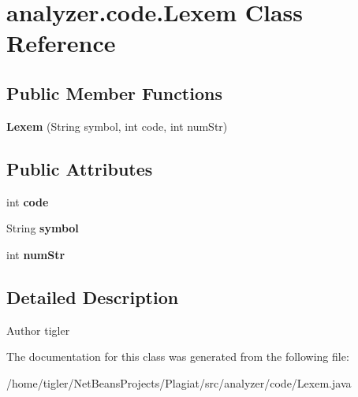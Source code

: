 \hypertarget{classanalyzer_1_1code_1_1Lexem}{}\section{analyzer.\+code.\+Lexem Class Reference}
\label{classanalyzer_1_1code_1_1Lexem}
\subsection*{Public Member Functions}
\begin{DoxyCompactItemize}
\item 
\mbox{\label{classanalyzer_1_1code_1_1Lexem_a4910a076f97361110c33e2a63abb490d}} 
{\bfseries Lexem} (String symbol, int code, int num\+Str)
\end{DoxyCompactItemize}
\subsection*{Public Attributes}
\begin{DoxyCompactItemize}
\item 
\mbox{\label{classanalyzer_1_1code_1_1Lexem_a930278746ac20d7c290c51c7d0720292}} 
int {\bfseries code}
\item 
\mbox{\label{classanalyzer_1_1code_1_1Lexem_a8c26f0d6518b66df1794c2e25c7f94fb}} 
String {\bfseries symbol}
\item 
\mbox{\label{classanalyzer_1_1code_1_1Lexem_ab040e60f7db2a596a852739fd744d290}} 
int {\bfseries num\+Str}
\end{DoxyCompactItemize}


\subsection{Detailed Description}
\begin{DoxyAuthor}{Author}
tigler 
\end{DoxyAuthor}


The documentation for this class was generated from the following file\+:\begin{DoxyCompactItemize}
\item 
/home/tigler/\+Net\+Beans\+Projects/\+Plagiat/src/analyzer/code/Lexem.\+java\end{DoxyCompactItemize}
